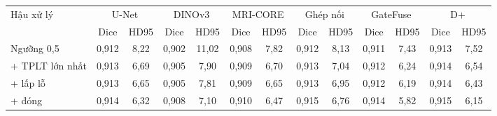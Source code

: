 \begin{tabular}{lcccccccccccc}
\toprule
Hậu xử lý & \multicolumn{2}{c}{U-Net} & \multicolumn{2}{c}{DINOv3} & \multicolumn{2}{c}{MRI-CORE} & \multicolumn{2}{c}{Ghép nối} & \multicolumn{2}{c}{GateFuse} & \multicolumn{2}{c}{D+}\\
 & Dice & HD95 & Dice & HD95 & Dice & HD95 & Dice & HD95 & Dice & HD95 & Dice & HD95\\
\midrule
Ngưỡng 0{,}5 & 0{,}912 & 8{,}22 & 0{,}902 & 11{,}02 & 0{,}908 & 7{,}82 & 0{,}912 & 8{,}13 & 0{,}911 & 7{,}43 & 0{,}913 & 7{,}52\\
+ TPLT lớn nhất & 0{,}913 & 6{,}69 & 0{,}905 & 7{,}90 & 0{,}909 & 6{,}70 & 0{,}913 & 7{,}04 & 0{,}912 & 6{,}24 & 0{,}914 & 6{,}54\\
+ lấp lỗ & 0{,}913 & 6{,}65 & 0{,}905 & 7{,}81 & 0{,}909 & 6{,}65 & 0{,}913 & 6{,}95 & 0{,}912 & 6{,}19 & 0{,}914 & 6{,}43\\
+ đóng & 0{,}914 & 6{,}32 & 0{,}908 & 7{,}10 & 0{,}910 & 6{,}47 & 0{,}915 & 6{,}76 & 0{,}914 & 5{,}82 & 0{,}915 & 6{,}15\\
\bottomrule
\end{tabular}